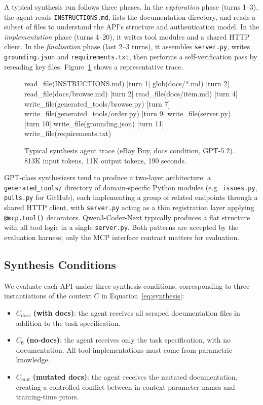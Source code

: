 A typical synthesis run follows three phases. In the \emph{exploration} phase (turns 1--3), the agent reads \texttt{INSTRUCTIONS.md}, lists the documentation directory, and reads a subset of files to understand the API's structure and authentication model. In the \emph{implementation} phase (turns 4--20), it writes tool modules and a shared HTTP client. In the \emph{finalisation} phase (last 2--3 turns), it assembles \texttt{server.py}, writes \texttt{grounding.json} and
\texttt{requirements.txt}, then performs a self-verification pass by
rereading key files. Figure~\ref{fig:synth-trace} shows a representative trace.

\begin{figure}[h]
\begin{TraceBox}
[turn 1]  read_file(INSTRUCTIONS.md)
[turn 1]  glob(docs/*.md)
[turn 2]  read_file(docs/browse.md)
[turn 2]  read_file(docs/item.md)
[turn 4]  write_file(generated_tools/browse.py)
[turn 7]  write_file(generated_tools/order.py)
[turn 9]  write_file(server.py)
[turn 10] write_file(grounding.json)
[turn 11] write_file(requirements.txt)
\end{TraceBox}
\caption{Typical synthesis agent trace (eBay Buy, docs condition, GPT-5.2).
813K input tokens, 11K output tokens, 190 seconds.}
\label{fig:synth-trace}
\end{figure}

\noindent
GPT-class synthesizers tend to produce a two-layer architecture: a \texttt{generated\_tools/} directory of domain-specific Python modules (e.g.\ \texttt{issues.py}, \texttt{pulls.py} for GitHub), each implementing a group of related endpoints through a shared HTTP client, with \texttt{server.py} acting as a thin registration layer applying \texttt{@mcp.tool()} decorators. Qwen3-Coder-Next typically produces a flat structure with all tool logic in a single \texttt{server.py}. Both patterns are accepted by the evaluation harness; only the MCP interface contract matters for evaluation.

\subsection{Synthesis Conditions}

We evaluate each API under three synthesis conditions, corresponding to three
instantiations of the context $C$ in Equation~\ref{eq:synthesis}:

\begin{itemize}
  \item $C_{\text{docs}}$ \textbf{(with docs)}: the agent receives all
    scraped documentation files in addition to the task specification.
  \item $C_{\emptyset}$ \textbf{(no-docs)}: the agent receives only the
    task specification, with no documentation. All tool implementations must
    come from parametric knowledge.
  \item $C_{\text{mut}}$ \textbf{(mutated docs)}: the agent receives the
    mutated documentation, creating a controlled conflict between in-context
    parameter names and training-time priors.
\end{itemize}

